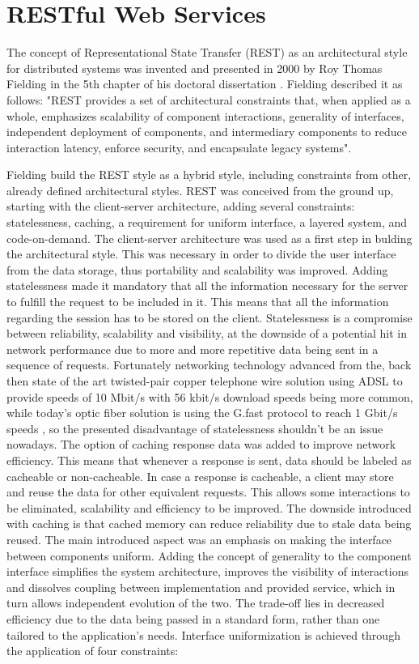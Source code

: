 \documentclass[12pt,a4paper,twoside]{report}
\begin{document}
\section{RESTful Web Services}

The concept of Representational State Transfer (REST) as an architectural style for distributed systems was invented and presented in 2000 by Roy Thomas Fielding in the 5th chapter of his doctoral dissertation \cite{fielding_rest_definition}. Fielding described it as follows: "REST provides a set of architectural constraints that, when applied as a whole, emphasizes scalability of component interactions, generality of interfaces, independent deployment of components, and intermediary components to reduce interaction latency, enforce security, and encapsulate legacy systems".

Fielding build the REST style as a hybrid style, including constraints from other, already defined architectural styles. REST was conceived from the ground up, starting with the client-server architecture, adding several constraints: statelessness, caching, a requirement for uniform interface, a layered system, and code-on-demand. The client-server architecture was used as a first step in bulding the architectural style. This was necessary in order to divide the user interface from the data storage, thus portability and scalability was improved. Adding statelessness made it mandatory that all the information necessary for the server to fulfill the request to be included in it. This means that all the information regarding the session has to be stored on the client. Statelessness is a compromise between reliability, scalability and visibility, at the downside of a potential hit in network performance due to more and more repetitive data being sent in a sequence of requests. Fortunately networking technology advanced from the, back then state of the art twisted-pair copper telephone wire solution using ADSL to provide speeds of 10 Mbit/s with 56 kbit/s download speeds being more common, while today's optic fiber solution is using the G.fast protocol to reach 1 Gbit/s speeds \cite{historical_net_speeds}, so the presented disadvantage of statelessness shouldn't be an issue nowadays. The option of caching response data was added to improve network efficiency. This means that whenever a response is sent, data should be labeled as cacheable or non-cacheable. In case a response is cacheable, a client may store and reuse the data for other equivalent requests. This allows some interactions to be eliminated, scalability and efficiency to be improved. The downside introduced with caching is that cached memory can reduce reliability due to stale data being reused. The main introduced aspect was an emphasis on making the interface between components uniform. Adding the concept of generality to the component interface simplifies the system architecture, improves the visibility of interactions and dissolves coupling between implementation and provided service, which in turn allows independent evolution of the two. The trade-off lies in decreased efficiency due to the data being passed in a standard form, rather than one tailored to the application's needs. Interface uniformization is achieved through the application of four constraints: 
\end{document}
